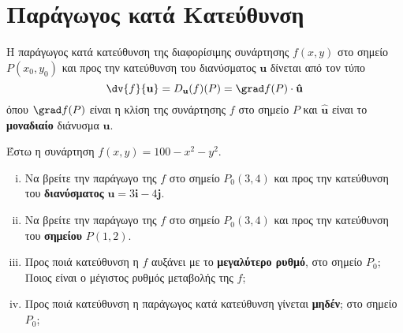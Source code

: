 \section{Παράγωγος κατά Κατεύθυνση}

\begin{dfn}
  Η \textcolor{Col1}{παράγωγος κατά κατεύθυνση} της διαφορίσιμης συνάρτησης 
  $ f(x,y) $ στο σημείο $ P(x_{0}, y_{0}) $ και προς την κατεύθυνση του διανύσματος 
  $ \mathbf{u} $ δίνεται από τον τύπο
  \[
    \dv{f}{\mathbf{u}} = D_{\mathbf{u}}(f)(P) = \grad f(P) \cdot \mathbf{\hat{u}} 
  \] 
  όπου $ \grad f (P) $ είναι η κλίση της συνάρτησης $f$ στο σημείο $P$ και 
  $ \mathbf{\hat{u}} $ είναι το \textbf{μοναδιαίο} διάνυσμα $ \mathbf{u} $.
\end{dfn}
\begin{example}
  Έστω η συνάρτηση $ f(x,y) = 100-x^{2}-y^{2} $. 
  \begin{enumerate}[i)]
    \item Να βρείτε την παράγωγο της $f$ στο σημείο $ P_{0}(3,4) $ και προς την 
      κατεύθυνση του \textbf{διανύσματος} $ \mathbf{u} = 3 \mathbf{i}- 4 \mathbf{j} $.
    \item Να βρείτε την παράγωγο της $f$ στο σημείο $ P_{0}(3,4) $ και προς την 
      κατεύθυνση του \textbf{σημείου} $P(1,2)$.
    \item Προς ποιά κατεύθυνση η $f$ αυξάνει με το \textbf{μεγαλύτερο ρυθμό}, 
      στο σημείο $ P_{0} $; Ποιος είναι ο μέγιστος ρυθμός μεταβολής της $f$;
    \item Προς ποιά κατεύθυνση η παράγωγος κατά κατεύθυνση γίνεται \textbf{μηδέν}; στο 
      σημείο $ P_{0} $;
  \end{enumerate}
\end{example}
